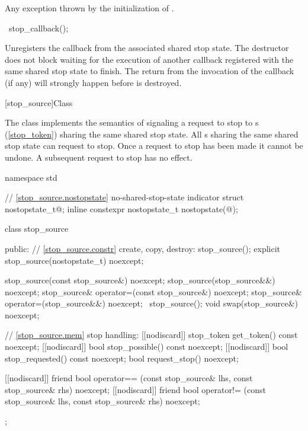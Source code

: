 {\begin{itemdescr}
  \pnum\throws Any exception thrown by the initialization of .
\end{itemdescr}

%
\begin{itemdecl}
~stop_callback();
\end{itemdecl}
\begin{itemdescr}
  \pnum\effects Unregisters the callback from the associated shared stop state.
                The destructor does not block waiting for the execution of another callback registered
                with the same shared stop state to finish.
                The return from the invocation of the callback (if any) will strongly happen before  is destroyed.
\end{itemdescr}

%
[stop_source]{Class }

\pnum
{}%
The class  implements the semantics of signaling a request to stop
to s (\ref{stop_token}) sharing the same shared stop state.
All s sharing the same shared stop state can request to stop.
Once a request to stop has been made it cannot be undone.
A subsequent request to stop has no effect.

\begin{codeblock}
namespace std {
  // \ref{stop_source.nostopstate} no-shared-stop-state indicator
  struct nostopstate_t{@\seebelow@};
  inline constexpr nostopstate_t nostopstate(@\unspec@);

  class stop_source {
  public:
    // \ref{stop_source.constr} create, copy, destroy:
    stop_source();
    explicit stop_source(nostopstate_t) noexcept;

    stop_source(const stop_source&) noexcept;
    stop_source(stop_source&&) noexcept;
    stop_source& operator=(const stop_source&) noexcept;
    stop_source& operator=(stop_source&&) noexcept;
    ~stop_source();
    void swap(stop_source&) noexcept;

    // \ref{stop_source.mem} stop handling:
    [[nodiscard]] stop_token get_token() const noexcept;
    [[nodiscard]] bool stop_possible() const noexcept;
    [[nodiscard]] bool stop_requested() const noexcept;
    bool request_stop() noexcept;

    [[nodiscard]] friend bool operator== (const stop_source& lhs, const stop_source& rhs) noexcept;
    [[nodiscard]] friend bool operator!= (const stop_source& lhs, const stop_source& rhs) noexcept;
  };
}
\end{codeblock}

}
